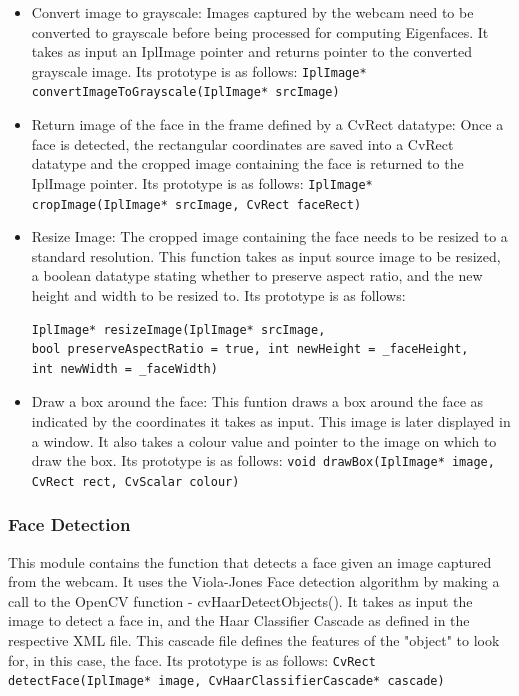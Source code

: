 \documentclass[12pt]{article}			%
\begin{document}
\begin{itemize}
\item Convert image to grayscale: Images captured by the webcam need to be converted to grayscale before being processed for computing Eigenfaces. It takes as input an IplImage pointer and returns pointer to the converted grayscale image. Its prototype is as follows:
\verb+IplImage* convertImageToGrayscale(IplImage* srcImage)+
\item Return image of the face in the frame defined by a CvRect datatype: Once a face is detected, the rectangular coordinates are saved into a CvRect datatype and the cropped image containing the face is returned to the IplImage pointer. Its prototype is as follows:
\verb+IplImage* cropImage(IplImage* srcImage, CvRect faceRect)+
\item Resize Image: The cropped image containing the face needs to be resized to a standard resolution. This function takes as input source image to be resized, a boolean datatype stating whether to preserve aspect ratio, and the new height and width to be resized to. Its prototype is as follows:
\begin{verbatim}
IplImage* resizeImage(IplImage* srcImage,
bool preserveAspectRatio = true, int newHeight = _faceHeight,
int newWidth = _faceWidth)
\end{verbatim}
\item Draw a box around the face: This funtion draws a box around the face as indicated by the coordinates it takes as input. This image is later displayed in a window. It also takes a colour value and pointer to the image on which to draw the box. Its prototype is as follows:
\verb+void drawBox(IplImage* image, CvRect rect, CvScalar colour)+
\end{itemize}

\subsubsection { Face Detection }
This module contains the function that detects a face given an image captured from the webcam. It uses the Viola-Jones Face detection algorithm by making a call to the OpenCV function - cvHaarDetectObjects(). It takes as input the image to detect a face in, and the Haar Classifier Cascade as defined in the respective XML file. This cascade file defines the features of the "object" to look for, in this case, the face. Its prototype is as follows:
\verb+CvRect detectFace(IplImage* image, CvHaarClassifierCascade* cascade)+
\end{document}
